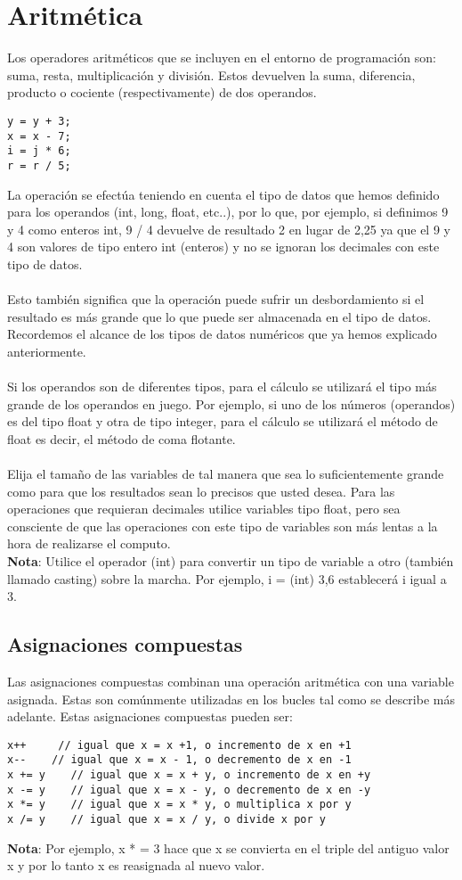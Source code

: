 \chapter{Aritmética}

Los operadores aritméticos que se incluyen en el entorno de programación son: suma, resta, multiplicación y división. Estos devuelven la suma, diferencia, producto o cociente (respectivamente) de dos operandos.
\begin{lstlisting}
y = y + 3;
x = x - 7;
i = j * 6;
r = r / 5;
\end{lstlisting}
La operación se efectúa teniendo en cuenta el tipo de datos que hemos definido para los operandos (int, long, float, etc..), por lo que, por ejemplo, si definimos 9 y 4 como enteros int, 9 / 4 devuelve de resultado 2 en lugar de 2,25 ya que el 9 y 4 son valores de tipo entero int (enteros) y no se ignoran los decimales con este tipo de datos.\\\\
Esto también significa que la operación puede sufrir un desbordamiento si el resultado es más grande que lo que puede ser almacenada en el tipo de datos. Recordemos el alcance de los tipos de datos numéricos que ya hemos explicado anteriormente.\\\\
Si los operandos son de diferentes tipos, para el cálculo se utilizará el tipo más grande de los operandos en juego. Por ejemplo, si uno de los números (operandos) es del tipo float y otra de tipo integer, para el cálculo se utilizará el método de float es decir, el método de coma flotante.\\\\
Elija el tamaño de las variables de tal manera que sea lo suficientemente grande como para que los resultados sean lo precisos que usted desea. Para las operaciones que requieran decimales utilice variables tipo float, pero sea consciente de que las operaciones con este tipo de variables son más lentas a la hora de realizarse el computo.\\
\textbf{Nota}: Utilice el operador (int) para convertir un tipo de variable a otro (también llamado casting) sobre la marcha. Por ejemplo, i = (int) 3,6 establecerá i igual a 3.
\section{Asignaciones compuestas}

Las asignaciones compuestas combinan una operación aritmética con una variable asignada. Estas son comúnmente utilizadas en los bucles tal como se describe más adelante. Estas asignaciones compuestas pueden ser:
\begin{lstlisting}
x++     // igual que x = x +1, o incremento de x en +1
x--    // igual que x = x - 1, o decremento de x en -1
x += y    // igual que x = x + y, o incremento de x en +y
x -= y    // igual que x = x - y, o decremento de x en -y
x *= y    // igual que x = x * y, o multiplica x por y
x /= y    // igual que x = x / y, o divide x por y
\end{lstlisting}
\textbf{Nota}: Por ejemplo, x * = 3 hace que x se convierta en el triple del antiguo valor x y por lo tanto x es reasignada al nuevo valor.
